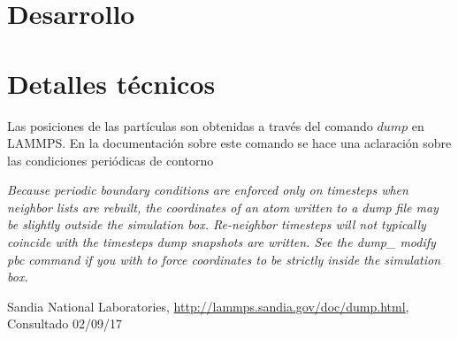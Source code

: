 \documentclass[
 reprint,
 amsmath,amssymb,
 aps,
 a4paper
]{revtex4-1}
\begin{document}
\section{\label{seq:desa}Desarrollo}

\section{\label{seq:details}Detalles técnicos}
Las posiciones de las partículas son obtenidas a través del comando $dump$ en LAMMPS. En la documentación\cite{dumplammps} sobre este comando se hace una aclaración sobre las condiciones periódicas de contorno
\begin{framed}
\textit{Because periodic boundary conditions are enforced only on timesteps when neighbor lists are rebuilt, the coordinates of an atom written to a dump file may be slightly outside the simulation box. Re-neighbor timesteps will not typically coincide with the timesteps dump snapshots are written. See the dump\_ modify pbc command if you with to force coordinates to be strictly inside the simulation box.}
\end{framed}


\begin{thebibliography}{9}

  Sandia National Laboratories,
  \url{http://lammps.sandia.gov/doc/dump.html},
  Consultado 02/09/17

\end{thebibliography}
\end{document}
